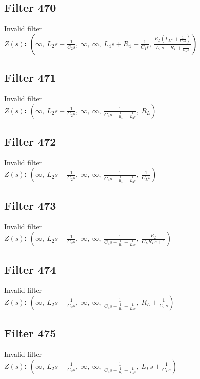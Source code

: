\documentclass{article}
\begin{document}
\subsection*{Filter 470}
Invalid filter \\ 
\textbf{$Z(s)$:} $\left( \infty, \  L_{2} s + \frac{1}{C_{2} s}, \  \infty, \  \infty, \  L_{4} s + R_{4} + \frac{1}{C_{4} s}, \  \frac{R_{L} \left(L_{L} s + \frac{1}{C_{L} s}\right)}{L_{L} s + R_{L} + \frac{1}{C_{L} s}}\right)$ \\ 
\subsection*{Filter 471}
Invalid filter \\ 
\textbf{$Z(s)$:} $\left( \infty, \  L_{2} s + \frac{1}{C_{2} s}, \  \infty, \  \infty, \  \frac{1}{C_{4} s + \frac{1}{R_{4}} + \frac{1}{L_{4} s}}, \  R_{L}\right)$ \\ 
\subsection*{Filter 472}
Invalid filter \\ 
\textbf{$Z(s)$:} $\left( \infty, \  L_{2} s + \frac{1}{C_{2} s}, \  \infty, \  \infty, \  \frac{1}{C_{4} s + \frac{1}{R_{4}} + \frac{1}{L_{4} s}}, \  \frac{1}{C_{L} s}\right)$ \\ 
\subsection*{Filter 473}
Invalid filter \\ 
\textbf{$Z(s)$:} $\left( \infty, \  L_{2} s + \frac{1}{C_{2} s}, \  \infty, \  \infty, \  \frac{1}{C_{4} s + \frac{1}{R_{4}} + \frac{1}{L_{4} s}}, \  \frac{R_{L}}{C_{L} R_{L} s + 1}\right)$ \\ 
\subsection*{Filter 474}
Invalid filter \\ 
\textbf{$Z(s)$:} $\left( \infty, \  L_{2} s + \frac{1}{C_{2} s}, \  \infty, \  \infty, \  \frac{1}{C_{4} s + \frac{1}{R_{4}} + \frac{1}{L_{4} s}}, \  R_{L} + \frac{1}{C_{L} s}\right)$ \\ 
\subsection*{Filter 475}
Invalid filter \\ 
\textbf{$Z(s)$:} $\left( \infty, \  L_{2} s + \frac{1}{C_{2} s}, \  \infty, \  \infty, \  \frac{1}{C_{4} s + \frac{1}{R_{4}} + \frac{1}{L_{4} s}}, \  L_{L} s + \frac{1}{C_{L} s}\right)$ \\ 
\end{document}
